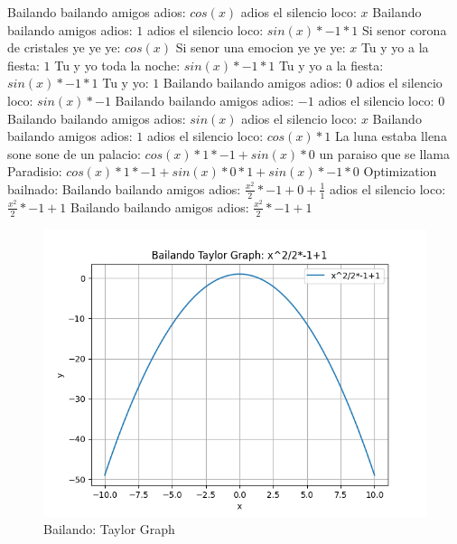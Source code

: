 \documentclass{article}
\begin{document}
Bailando bailando amigos adios: $cos(x)$  \newline adios el silencio loco: $x$ Bailando bailando amigos adios: $1$  \newline adios el silencio loco: $sin(x)*-1*1$ Si senor corona de cristales ye ye ye: $cos(x)$  \newline Si senor una emocion ye ye ye: $x$ Tu y yo a la fiesta: $1$  \newline Tu y yo toda la noche: $sin(x)*-1*1$ Tu y yo a la fiesta: $sin(x)*-1*1$ Tu y yo: $1$ Bailando bailando amigos adios: $0$  \newline adios el silencio loco: $sin(x)*-1$ Bailando bailando amigos adios: $-1$ adios el silencio loco: $0$  \newline Bailando bailando amigos adios: $sin(x)$  \newline adios el silencio loco: $x$ Bailando bailando amigos adios: $1$  \newline adios el silencio loco: $cos(x)*1$ La luna estaba llena sone sone de un palacio: $cos(x)*1*-1+sin(x)*0$ un paraiso que se llama Paradisio: ${cos(x)*1*-1+sin(x)*0}*1+sin(x)*-1*0$  \newline \newline Optimization bailnado: \newline Bailando bailando amigos adios: $\frac{x^2}{2}*-1+0+\frac{1}{1}$  \newline adios el silencio loco: $\frac{x^2}{2}*-1+1$  \newline Bailando bailando amigos adios: $\frac{x^2}{2}*-1+1$  \newline \begin{figure}
\centering
\includegraphics[width=0.8\linewidth]{Bailando Taylor Graph.png}
\caption{Bailando: Taylor Graph}
\label{fig:my_image}
\end{figure}
\end{document}
